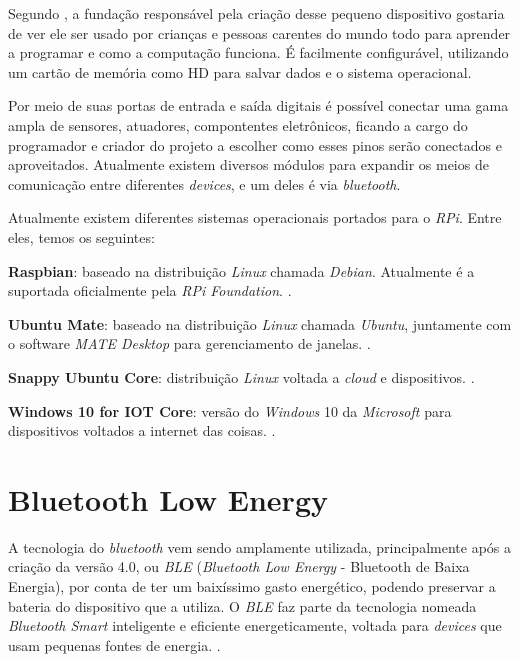 \documentclass[
	12pt,				%
	openright,			%
	oneside,			%
	a4paper,			%
	chapter=TITLE,		%
	english,			%
	brazil				%
	]{abntex2}
\begin{document}
{Segundo , a fundação responsável pela criação desse pequeno dispositivo gostaria de ver ele ser usado por crianças e pessoas carentes do mundo todo para aprender a programar e como a computação funciona. É facilmente configurável, utilizando um cartão de memória como HD para salvar dados e o sistema operacional.

Por meio de suas portas de entrada e saída digitais é possível conectar uma gama ampla de sensores, atuadores, compontentes eletrônicos, ficando a cargo do programador e criador do projeto a escolher como esses pinos serão conectados e aproveitados. Atualmente existem diversos módulos para expandir os meios de comunicação entre diferentes \textit{devices}, e um deles é via \textit{bluetooth}.

Atualmente existem diferentes sistemas operacionais portados para o \textit{RPi}. Entre eles, temos os seguintes:

\begin{alineas}
	\item \textbf{Raspbian}: baseado na distribuição \textit{Linux} chamada \textit{Debian}. Atualmente é a suportada oficialmente pela \textit{RPi Foundation}. \cite{rpi-download}.
	\item \textbf{Ubuntu Mate}: baseado na distribuição \textit{Linux} chamada \textit{Ubuntu}, juntamente com o software \textit{MATE Desktop} para gerenciamento de janelas. \cite{ubuntu-mate}.
	\item \textbf{Snappy Ubuntu Core}: distribuição \textit{Linux} voltada a \textit{cloud} e dispositivos. \cite{snappy-ubuntu}.
	\item \textbf{Windows 10 for IOT Core}: versão do \textit{Windows} 10 da \textit{Microsoft} para dispositivos voltados a internet das coisas. \cite{windows10-iot}.
\end{alineas}

\section{Bluetooth Low Energy}

A tecnologia do \textit{bluetooth} vem sendo amplamente utilizada, principalmente após a criação da versão 4.0, ou \textit{BLE} (\textit{Bluetooth Low Energy} - Bluetooth de Baixa Energia), por conta de ter um baixíssimo gasto energético, podendo preservar a bateria do dispositivo que a utiliza. O \textit{BLE} faz parte da tecnologia nomeada \textit{Bluetooth Smart} inteligente e eficiente energeticamente, voltada para \textit{devices} que usam pequenas fontes de energia. \cite{bluetooth-smart}.

}
\end{document}
